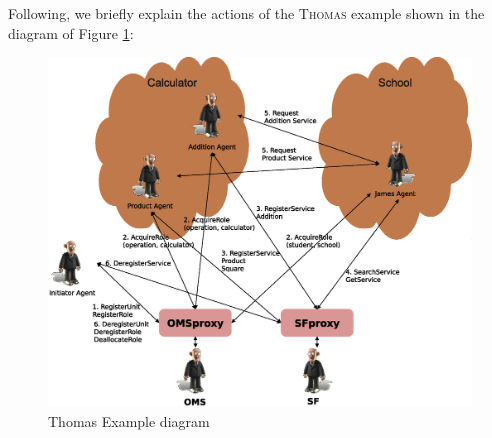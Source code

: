 Following, we briefly explain the actions of the \textsc{Thomas} example shown in the diagram of Figure \ref{fig:ThomasExample}:

\begin{figure}[h!t]
	\centering
	\includegraphics[width=1\textwidth]{Thomas/images/thomasExample}
	\caption{Thomas Example diagram}
	\label{fig:ThomasExample}
\end{figure}

